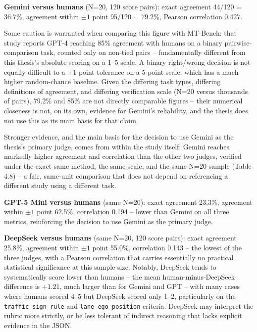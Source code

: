 \documentclass[12pt,a4paper]{report}
\begin{document}
\textbf{Gemini versus humans} (N=20, 120 score pairs): exact agreement 44/120 = 36.7\%, agreement within $\pm 1$ point 95/120 = 79.2\%, Pearson correlation 0.427.

Some caution is warranted when comparing this figure with MT-Bench: that study reports GPT-4 reaching 85\% agreement with humans on a binary pairwise-comparison task, counted only on non-tied pairs \cite{zheng2023mtbench} -- fundamentally different from this thesis's absolute scoring on a 1--5 scale. A binary right/wrong decision is not equally difficult to a $\pm 1$-point tolerance on a 5-point scale, which has a much higher random-chance baseline. Given the differing task types, differing definitions of agreement, and differing verification scale (N=20 versus thousands of pairs), 79.2\% and 85\% are not directly comparable figures -- their numerical closeness is not, on its own, evidence for Gemini's reliability, and the thesis does not use this as its main basis for that claim.

Stronger evidence, and the main basis for the decision to use Gemini as the thesis's primary judge, comes from within the study itself: Gemini reaches markedly higher agreement and correlation than the other two judges, verified under the exact same method, the same scale, and the same N=20 sample (Table 4.8) -- a fair, same-unit comparison that does not depend on referencing a different study using a different task.

\textbf{GPT-5 Mini versus humans} (same N=20): exact agreement 23.3\%, agreement within $\pm 1$ point 62.5\%, correlation 0.194 -- lower than Gemini on all three metrics, reinforcing the decision to use Gemini as the primary judge.

\textbf{DeepSeek versus humans} (same N=20, 120 score pairs): exact agreement 25.8\%, agreement within $\pm 1$ point 55.0\%, correlation 0.143 -- the lowest of the three judges, with a Pearson correlation that carries essentially no practical statistical significance at this sample size. Notably, DeepSeek tends to systematically score lower than humans -- the mean human-minus-DeepSeek difference is $+1.21$, much larger than for Gemini and GPT -- with many cases where humans scored 4--5 but DeepSeek scored only 1--2, particularly on the \texttt{traffic\_sign\_rule} and \texttt{lane\_ego\_position} criteria. DeepSeek may interpret the rubric more strictly, or be less tolerant of indirect reasoning that lacks explicit evidence in the JSON.
\end{document}
